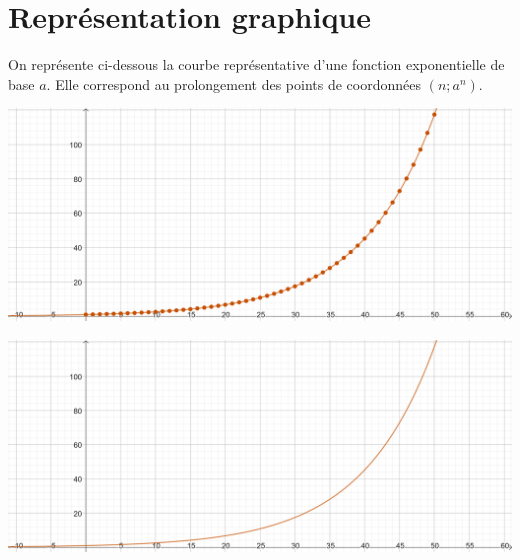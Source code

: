 \documentclass{article}
\begin{document}
\section{Représentation graphique}
On représente ci-dessous la courbe représentative d'une fonction exponentielle de base $a$. Elle correspond au prolongement des points de coordonnées $(n;a^n)$.
\vspace*{0.5cm}
\begin{center}
\begin{minipage}{0.45\textwidth}
\includegraphics[width=\textwidth]{Fonction_exponentielle.png}
\end{minipage}
\begin{minipage}{0.45\textwidth}
\includegraphics[width=\textwidth]{Fonction_exponentielle_2.png}
\end{minipage}
\end{center}
\end{document}
